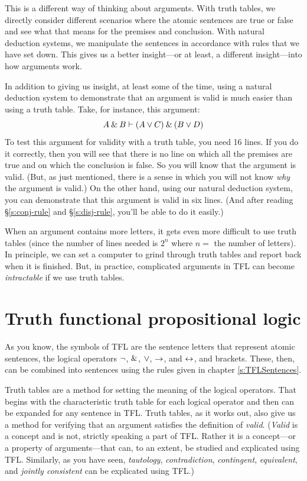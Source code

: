 This is a different way of thinking about arguments. With truth tables, we directly consider different scenarios where the atomic sentences are true or false and see what that means for the premises and conclusion. With natural deduction systems, we manipulate the sentences in accordance with rules that we have set down. This gives us a better insight---or at least, a different insight---into how arguments work.

In addition to giving us insight, at least some of the time, using a natural deduction system to demonstrate that an argument is valid is much easier than using a truth table. Take, for instance, this argument:
$$A \mathbin{\&} B \vdash (A \vee C) \mathbin{\&} (B \vee D)$$
To test this argument for validity with a truth table, you need 16 lines. If you do it correctly, then you will see that there is no line on which all the premises are true and on which the conclusion is false. So you will know that the argument is valid. (But, as just mentioned, there is a sense in which you will not know \emph{why} the argument is valid.) On the other hand, using our natural deduction system, you can demonstrate that this argument is valid in six lines. (And after reading \S\ref{s:conj-rule} and \S\ref{s:disj-rule}, you'll be able to do it easily.) 

When an argument contains more letters, it gets even more difficult to use truth tables (since the number of lines needed is $2^{n}$ where $n=$ the number of letters). In principle, we can set a computer to grind through truth tables and report back when it is finished. But, in practice, complicated arguments in TFL can become \emph{intractable} if we use truth tables. %


\section{Truth functional propositional logic}

As you know, the symbols of TFL are the sentence letters that represent atomic sentences, the logical operators ${\neg}$, $\mathbin{\&}$, $\vee$, $\rightarrow$, and $\leftrightarrow$, and brackets. These, then, can be combined into sentences using the rules given in chapter \ref{s:TFLSentences}. 

Truth tables are a method for setting the meaning of the logical operators. That begins with the characteristic truth table for each logical operator and then can be expanded for any sentence in TFL. Truth tables, as it works out, also give us a method for verifying that an argument satisfies the definition of \textit{valid}. (\textit{Valid} is a concept and is not, strictly speaking a part of TFL. Rather it is a concept---or a property of arguments---that can, to an extent, be studied and explicated using TFL. Similarly, as you have seen, \textit{tautology}, \textit{contradiction}, \textit{contingent}, \textit{equivalent}, and \textit{jointly consistent} can be explicated using TFL.) 

